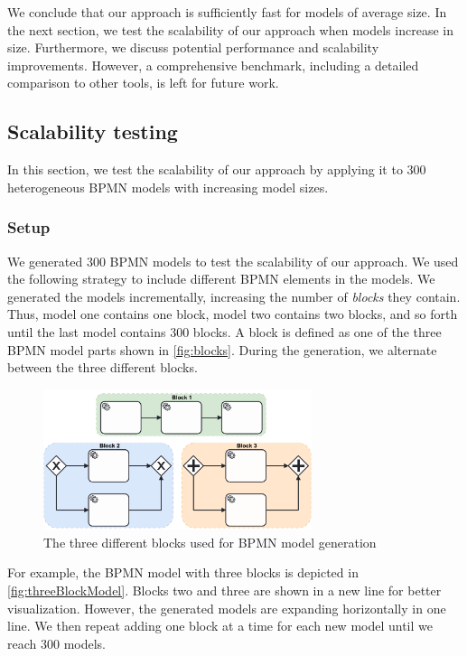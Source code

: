 \documentclass{lmcs} %
\begin{document}
We conclude that our approach is sufficiently fast for models of average size.
In the next section, we test the scalability of our approach when models increase in size.
Furthermore, we discuss potential performance and scalability improvements.
However, a comprehensive benchmark, including a detailed comparison to other tools, is left for future work.

\subsection{Scalability testing} \label{subsec:scalability}

In this section, we test the scalability of our approach by applying it to 300 heterogeneous BPMN models with increasing model sizes.

\subsubsection{Setup}

We generated 300 BPMN models to test the scalability of our approach.
We used the following strategy to include different BPMN elements in the models.
We generated the models incrementally, increasing the number of \textit{blocks} they contain.
Thus, model one contains one block, model two contains two blocks, and so forth until the last model contains 300 blocks.
A block is defined as one of the three BPMN model parts shown in \autoref{fig:blocks}.
During the generation, we alternate between the three different blocks.

\begin{figure}[ht]
    \centering
    \includegraphics[width=0.7\textwidth]{images/blocks.pdf}
    \caption{The three different blocks used for BPMN model generation}
    \label{fig:blocks}
\end{figure}

For example, the BPMN model with three blocks is depicted in \autoref{fig:threeBlockModel}.
Blocks two and three are shown in a new line for better visualization.
However, the generated models are expanding horizontally in one line.
We then repeat adding one block at a time for each new model until we reach 300 models.
\end{document}

